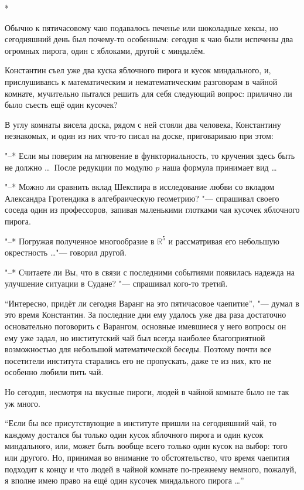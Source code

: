 \medskip
\begin{center}
*\quad*\quad*
\end{center}

\medskip
Обычно к пятичасовому чаю подавалось печенье или шоколадные кексы, но
сегодняшний день был почему-то особенным: сегодня к чаю были испечены два
огромных пирога, один с яблоками, другой с миндалём.

Константин съел уже два куска яблочного пирога и кусок миндального, и,
прислушиваясь к математическим и нематематическим разговорам в чайной комнате,
мучительно пытался решить для себя следующий вопрос: прилично ли было съесть ещё
один кусочек?

В углу комнаты висела доска, рядом с ней стояли два человека, Константину
незнакомых, и один из них что-то писал на доске, приговариваю при этом:

"--* Если мы поверим на мгновение в функториальность, то кручения здесь быть не
должно \ldots\
После редукции по модулю $p$ наша формула принимает вид \ldots

"--* Можно ли сравнить вклад Шекспира в исследование любви со вкладом Александра
Гротендика в алгебраическую геометрию? "--- спрашивал своего соседа один из
профессоров, запивая маленькими глотками чая кусочек яблочного пирога.

"--* Погружая полученное многообразие в $\mathbb{R}^5$ и рассматривая его
небольшую окрестность \ldots "--- говорил другой.

"--* Считаете ли Вы, что в связи с последними событиями появилась надежда на
улучшение ситуации в Судане? "--- спрашивал кого-то третий.

\enquote{Интересно, придёт ли сегодня Варанг на это пятичасовое чаепитие}, "---
думал в это время Константин.
За последние дни ему удалось уже два раза достаточно основательно поговорить с
Варангом, основные имевшиеся у него вопросы он ему уже задал, но институтский
чай был всегда наиболее благоприятной возможностью для небольшой математической
беседы.
Поэтому почти все посетители института старались его не пропускать, даже те из
них, кто не особенно любили пить чай.

Но сегодня, несмотря на вкусные пироги, людей в чайной комнате было не так уж
много.

\enquote{Если бы все присутствующие в институте пришли на сегодняшний чай, то
каждому достался бы только один кусок яблочного пирога и один кусок миндального,
или, может быть вообще всего только один кусок на выбор: того или другого.
Но, принимая во внимание то обстоятельство, что время чаепития подходит к концу
и что людей в чайной комнате по-прежнему немного, пожалуй, я вполне имею право
на ещё один кусочек миндального пирога \ldots}

